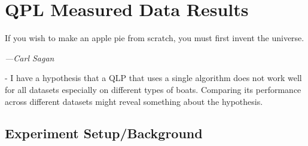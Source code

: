 \documentclass[class=report,11pt,crop=false]{standalone}
\begin{document}
\ifstandalone
\tableofcontents
\fi
\chapter{QPL Measured Data Results \label{ch:validation}}
\epigraph{If you wish to make an apple pie from scratch, you must first invent the universe.}%
    {\emph{---Carl Sagan}}
\vspace{0.5cm}

 

- I have a hypothesis that a QLP that uses a single algorithm does not work well for all datasets especially on different types of boats. Comparing its performance across different datasets might reveal something about the hypothesis.
\section{Experiment Setup/Background}
\end{document}
